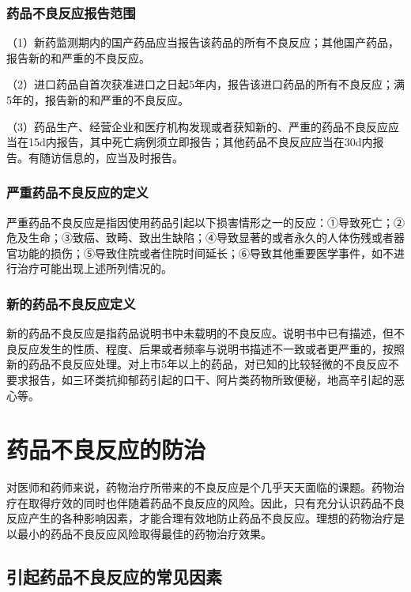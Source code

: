 \subsubsection{药品不良反应报告范围}

（1）新药监测期内的国产药品应当报告该药品的所有不良反应；其他国产药品，报告新的和严重的不良反应。

（2）进口药品自首次获准进口之日起5年内，报告该进口药品的所有不良反应；满5年的，报告新的和严重的不良反应。

（3）药品生产、经营企业和医疗机构发现或者获知新的、严重的药品不良反应应当在15d内报告，其中死亡病例须立即报告；其他药品不良反应应当在30d内报告。有随访信息的，应当及时报告。

\subsubsection{严重药品不良反应的定义}

严重药品不良反应是指因使用药品引起以下损害情形之一的反应：①导致死亡；②危及生命；③致癌、致畸、致出生缺陷；④导致显著的或者永久的人体伤残或者器官功能的损伤；⑤导致住院或者住院时间延长；⑥导致其他重要医学事件，如不进行治疗可能出现上述所列情况的。

\subsubsection{新的药品不良反应定义}

新的药品不良反应是指药品说明书中未载明的不良反应。说明书中已有描述，但不良反应发生的性质、程度、后果或者频率与说明书描述不一致或者更严重的，按照新的药品不良反应处理。对上市5年以上的药品，对已知的比较轻微的不良反应不要求报告，如三环类抗抑郁药引起的口干、阿片类药物所致便秘，地高辛引起的恶心等。

\section{药品不良反应的防治}

对医师和药师来说，药物治疗所带来的不良反应是个几乎天天面临的课题。药物治疗在取得疗效的同时也伴随着药品不良反应的风险。因此，只有充分认识药品不良反应产生的各种影响因素，才能合理有效地防止药品不良反应。理想的药物治疗是以最小的药品不良反应风险取得最佳的药物治疗效果。

\subsection{引起药品不良反应的常见因素}

